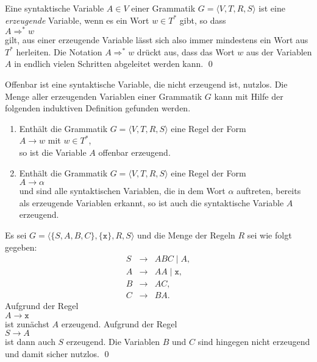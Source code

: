 \begin{Definition} \lb
Eine syntaktische Variable $A \in V$ einer Grammatik $G = \langle V, T, R, S \rangle$ 
ist eine \emph{erzeugende} Variable, wenn es ein Wort $w \in T^*$ gibt, so dass
\\[0.2cm]
\hspace*{1.3cm}
$A \Rightarrow^* w$
\\[0.2cm]
gilt, aus einer erzeugende Variable l\"asst sich also immer mindestens ein Wort aus $T^*$ herleiten. 
Die Notation $A \Rightarrow^* w$ dr\"uckt aus, dass das Wort $w$ aus der Variablen $A$ in endlich vielen
Schritten abgeleitet werden kann.
\qed 
\end{Definition}

\noindent
Offenbar ist eine syntaktische Variable, die nicht erzeugend ist, nutzlos.  Die Menge aller
erzeugenden Variablen einer Grammatik $G$  kann mit Hilfe der folgenden induktiven Definition
gefunden werden.
\begin{enumerate}
\item Enth\"alt die Grammatik $G = \langle V, T, R, S \rangle$ eine Regel der Form
      \\[0.2cm]
      \hspace*{1.3cm}
       $A \rightarrow w$ \quad mit $w \in T^*$, 
      \\[0.2cm]
      so ist die Variable $A$ offenbar erzeugend.
\item Enth\"alt die Grammatik $G = \langle V, T, R, S \rangle$ eine Regel der Form
      \\[0.2cm]
      \hspace*{1.3cm}
       $A \rightarrow \alpha$ 
      \\[0.2cm]
      und sind alle syntaktischen Variablen, die in dem Wort $\alpha$ auftreten, bereits
      als erzeugende Variablen 
      erkannt, so ist auch die syntaktische Variable $A$ erzeugend.
\end{enumerate}

\example
Es sei $G = \langle \{S, A, B, C\}, \{ \texttt{x} \}, R, S \rangle$ und die Menge der Regeln $R$
sei wie folgt gegeben:
\begin{eqnarray*}
  S & \rightarrow & A B C \mid A,           \\
  A & \rightarrow & A A \mid \texttt{x},    \\
  B & \rightarrow & A C,                    \\
  C & \rightarrow & B A.                    
\end{eqnarray*}
Aufgrund der Regel
\\[0.2cm]
\hspace*{1.3cm}
$A \rightarrow \texttt{x}$
\\[0.2cm]
ist zun\"achst $A$ erzeugend.  Aufgrund der Regel
\\[0.2cm]
\hspace*{1.3cm}
$S \rightarrow A$
\\[0.2cm]
ist dann auch $S$ erzeugend.  Die Variablen $B$ und $C$ sind hingegen nicht erzeugend und damit sicher
nutzlos.  \qed
\vspace*{0.2cm}


